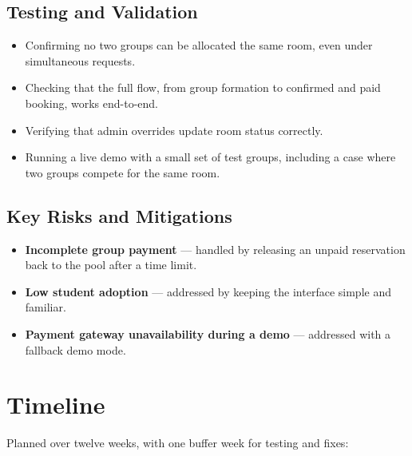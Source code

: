 \documentclass[11pt]{article}
\begin{document}
\subsection*{Testing and Validation}
\begin{itemize}[leftmargin=1.2cm]
    \item Confirming no two groups can be allocated the same room, even under simultaneous requests.
    \item Checking that the full flow, from group formation to confirmed and paid booking, works end-to-end.
    \item Verifying that admin overrides update room status correctly.
    \item Running a live demo with a small set of test groups, including a case where two groups compete for the same room.
\end{itemize}

\subsection*{Key Risks and Mitigations}
\begin{itemize}[leftmargin=1.2cm]
    \item \textbf{Incomplete group payment} --- handled by releasing an unpaid reservation back to the pool after a time limit.
    \item \textbf{Low student adoption} --- addressed by keeping the interface simple and familiar.
    \item \textbf{Payment gateway unavailability during a demo} --- addressed with a fallback demo mode.
\end{itemize}

\section{Timeline}
Planned over twelve weeks, with one buffer week for testing and fixes:
\end{document}
